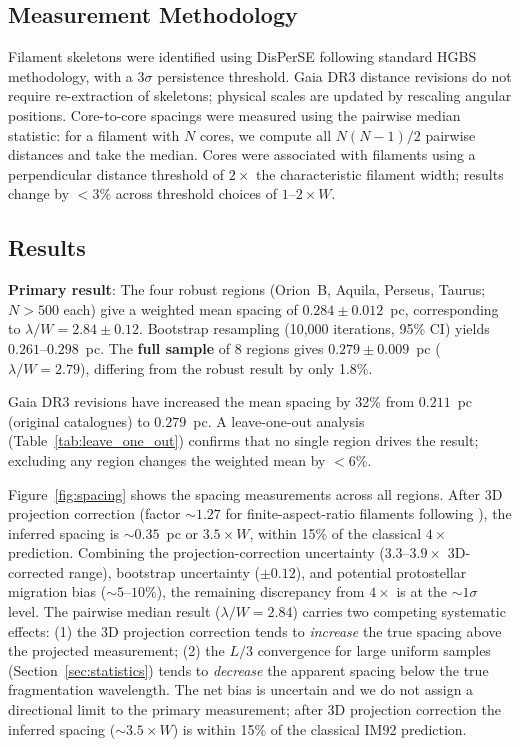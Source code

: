 \documentclass[twoside,twocolumn]{mnras}
\begin{document}
\subsection{Measurement Methodology}

Filament skeletons were identified using DisPerSE \citep{Sousbie2011} following standard
HGBS methodology, with a $3\sigma$ persistence threshold. Gaia DR3 distance revisions
do not require re-extraction of skeletons; physical scales are updated by rescaling
angular positions. Core-to-core spacings were measured using the pairwise median
statistic: for a filament with $N$ cores, we compute all $N(N-1)/2$ pairwise distances
and take the median. Cores were associated with filaments using a perpendicular
distance threshold of $2\times$ the characteristic filament width; results change
by $<3\%$ across threshold choices of $1$--$2\times W$.

\subsection{Results}
\label{sec:results}

\textbf{Primary result}: The four robust regions (Orion~B, Aquila, Perseus, Taurus;
$N > 500$ each) give a weighted mean spacing of $0.284 \pm 0.012$~pc,
corresponding to $\lambda/W = 2.84 \pm 0.12$. Bootstrap resampling (10,000 iterations,
95\% CI) yields $0.261$--$0.298$~pc. The \textbf{full sample} of 8 regions gives
$0.279 \pm 0.009$~pc ($\lambda/W = 2.79$), differing from the robust result by
only 1.8\%.

Gaia DR3 revisions have increased the mean spacing by 32\% from $0.211$~pc (original
catalogues) to $0.279$~pc. A leave-one-out analysis (Table~\ref{tab:leave_one_out})
confirms that no single region drives the result; excluding any region changes
the weighted mean by $<6\%$.

Figure~\ref{fig:spacing} shows the spacing measurements across all regions.
After 3D projection correction (factor ${\sim}1.27$ for finite-aspect-ratio filaments
following \citealt{Hacar2013}), the inferred spacing is ${\sim}0.35$~pc or $3.5\times W$,
within 15\% of the classical $4\times$ prediction. Combining the projection-correction
uncertainty ($3.3$--$3.9\times$ 3D-corrected range), bootstrap uncertainty ($\pm 0.12$),
and potential protostellar migration bias ($\sim 5$--$10\%$), the remaining discrepancy
from $4\times$ is at the ${\sim}1\sigma$ level. The pairwise median result ($\lambda/W = 2.84$) carries two competing systematic effects:
(1) the 3D projection correction tends to \textit{increase} the true spacing above the
projected measurement; (2) the $L/3$ convergence for large uniform samples
(Section~\ref{sec:statistics}) tends to \textit{decrease} the apparent spacing below the
true fragmentation wavelength. The net bias is uncertain and we do not assign a directional
limit to the primary measurement; after 3D projection correction the inferred spacing
(${\sim}3.5\times W$) is within 15\% of the classical IM92 prediction.
\end{document}

